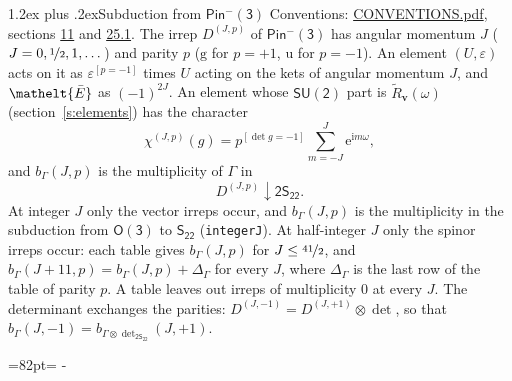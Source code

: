 \documentclass[10pt,a4paper]{article}
\makeatletter
\renewcommand\section{\@startsection{section}{1}{\z@}{-3ex plus -1ex minus -.2ex}%
  {1.2ex plus .2ex}{\normalfont\large\sffamily\bfseries\color{parttitle}}}
\newcommand{\needspace}[1]{\par\penalty-100\begingroup\dimen0=#1\relax\dimen2=\pagegoal
  \advance\dimen2-\pagetotal\ifdim\dimen0>\dimen2\relax\ifdim\dimen2>0pt\vfil\break\fi\fi
  \endgroup}
\numberwithin{equation}{section}
\newcommand{\eltfont}[1]{{\let\sigma\eltsigma\mathelt{#1}}}
\newcommand{\grp}[1]{\mathsf{#1}}
\newcommand{\elt}[1]{\eltfont{#1}}
\newcommand{\ptag}[1]{\mathrm{#1}}
\newcommand{\iverson}[1]{[#1]}
\newcommand{\restr}[2]{#1\!\downarrow#2}
\newcommand{\vv}{\mathbf{v}}
\newcommand{\iunit}{\mathrm{i}}
\newcommand{\expe}{\mathrm{e}}
\newcommand{\irrJp}[2]{D^{(#1,#2)}}
\newcommand{\irrprod}{\otimes}
\newcommand{\barred}[1]{\bar{#1}}
\newcommand{\lift}[1]{\tilde{#1}}
\makeatother
\begin{document}
\section{Subduction from \texorpdfstring{$\grp{Pin^{-}(3)}$}{Pin(3)}}\label{s:subduction_parent}
Conventions: \href{../../CONVENTIONS.pdf}{CONVENTIONS.pdf}, sections \href{../../../rotation/CONVENTIONS.pdf\#conv.11}{11} and \href{../../CONVENTIONS.pdf\#conv.25.1}{25.1}.
\leavevmode\label{n:index.J}\label{n:index.parity}\label{n:irrep.o3}The irrep $\irrJp{J}{p}$ of \href{Pinminus3.pdf}{$\grp{Pin^{-}(3)}$} has angular momentum $J$ ($J = 0, \nicefrac{1}{2}, 1, \dots$) and parity $p$ ($\ptag{g}$ for $p = +1$, $\ptag{u}$ for $p = -1$). An element $(U, \varepsilon)$ acts on it as $\varepsilon^{[p = -1]}$ times $U$ acting on the kets of angular momentum $J$, and $\elt{\barred{E}}$ as $(-1)^{2J}$. \label{n:function.character.parent}\label{n:function.multiplicity}An element whose $\grp{SU(2)}$ part is $\lift{R}_{\vv}(\omega)$ (section~\ref{s:elements}) has the character
\begin{equation}\label{e:chi}\chi^{(J,p)}(g) = p^{\iverson{\det g = -1}}\sum_{m=-J}^{J} \expe^{\iunit m\omega},\end{equation}
and $b_\Gamma(J, p)$ is the multiplicity of $\Gamma$ in
\begin{equation}\label{e:parent}\restr{\irrJp{J}{p}}{\grp{2S_{22}}}.\end{equation}
At integer $J$ only the vector irreps occur, and $b_\Gamma(J, p)$ is the multiplicity in the subduction from $\grp{O(3)}$ to \href{../../../rotation/data/pdf/S22.pdf}{$\grp{S_{22}}$} (\texttt{integerJ}). \label{n:index.increment}At half-integer $J$ only the spinor irreps occur: each table gives $b_\Gamma(J, p)$ for $J \le \nicefrac{41}{2}$, and $b_\Gamma(J + 11, p) = b_\Gamma(J, p) + \Delta_\Gamma$ for every $J$, where $\Delta_\Gamma$ is the last row of the table of parity $p$. A table leaves out irreps of multiplicity 0 at every $J$.
\leavevmode\label{n:operator.determinant.character}The determinant exchanges the parities: $\irrJp{J}{-1} = \irrJp{J}{+1} \irrprod \det$, so that $b_\Gamma(J, -1) = b_{\Gamma \irrprod \det_{\grp{2S_{22}}}}(J, +1)$.
\needspace{82pt}
\end{document}
